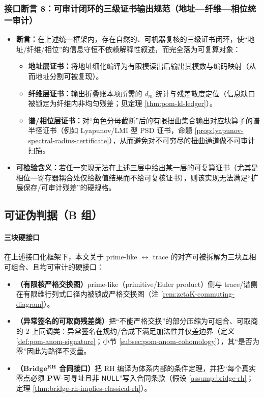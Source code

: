\subsubsection{接口断言 8：可审计闭环的三级证书输出规范（地址—纤维—相位统一审计）}\label{app:bridgepack-assertion-8}
\begin{itemize}
  \item \textbf{断言：}在上述统一框架内，存在自然的、可机器复核的三级证书闭环，使“地址/纤维/相位”的信息守恒不依赖解释性叙述，而完全落为可复算对象：
  \begin{itemize}
    \item \textbf{地址层证书：}将地址细化编译为有限模读出后输出其模数与编码映射（从而地址分割可被复现）。
    \item \textbf{纤维层证书：}输出折叠账本项所需的 \(d_m\) 统计与残差散度定位（信息缺口被锁定为纤维内非均匀残差；见定理 \ref{thm:pom-kl-ledger}）。
    \item \textbf{谱/相位层证书：}对“角色分母截断”后的有限扭曲集合输出对应块算子的谱半径证书（例如 Lyapunov/LMI 型 PSD 证书，命题 \ref{prop:lyapunov-spectral-radius-certificate}），从而避免对不可穷尽的扭曲通道做不可审计扫描。
  \end{itemize}
  \item \textbf{可检验含义：}若任一实现无法在上述三层中给出某一层的可复算证书（尤其是相位—寄存器耦合处仅给数值结果而不给可复核证书），则该实现无法满足“扩展保存/可审计残差”的硬规格。
\end{itemize}

\subsection{可证伪判据（B 组）}\label{subsec:bridgepack-criteria}
\paragraph{三块硬接口}
在上述接口化框架下，本文关于 prime-like \(\leftrightarrow\) trace 的对齐可被拆解为三块互相可组合、且均可审计的硬接口：
\begin{itemize}
  \item \textbf{（有限核严格交换图）}prime-like（primitive/Euler product）侧与 trace/谱侧在有限维行列式口径内被锁成严格交换图（注 \ref{rem:zetaK-commuting-diagram}）。
  \item \textbf{（异常签名的可取商残差类）}把“不能严格交换”的部分压缩为可组合、可取商的 \(2\)-上同调类：异常签名在规约/合成下满足加法性并仅差边界（定义 \ref{def:pom-anom-signature}；小节 \ref{subsec:pom-anom-cohomology}），其“是否为零”因此为路径不变量。
  \item \textbf{（\texorpdfstring{$\mathbf{Bridge^{RH}}$}{BridgeRH} 合同接口）}把 RH 编译为体系内部的条件定理，并把“每个真实零点必须 \(\mathbf{PW}\)-可寻址且非 \(\mathsf{NULL}\)”写入合同条款（假设 \ref{assump:bridge-rh}；定理 \ref{thm:bridge-rh-implies-classical-rh}）。
\end{itemize}
\par
